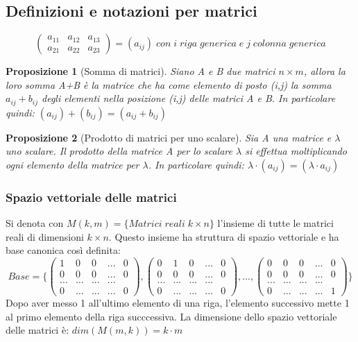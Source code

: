 \documentclass[12pt]{article}
\newenvironment{para}{\begin{adjustwidth}{13mm}{}}{\end{adjustwidth}}
\newtheorem{Proposizione}{Proposizione}[subsection]
\begin{document}
\begin{para}
\subsection{Definizioni e notazioni per matrici}
$$\begin{pmatrix}
a_{11} & a_{12} & a_{13}\\
a_{21} & a_{22} & a_{23}
\end{pmatrix} = (a_{ij}) \; con\; i\; riga\; generica\; e\; j\; colonna\; generica$$

\begin{Proposizione}[Somma di matrici] Siano A e B due matrici $n \times m$, allora la loro somma A+B è la matrice che ha come elemento di posto (i,j) la somma $a_{ij} + b_{ij}$ degli elementi nella posizione (i,j) delle matrici A e B. In particolare quindi: $(a_{ij}) + (b_{ij}) = (a_{ij} + b_{ij})$
\end{Proposizione}

\begin{Proposizione}[Prodotto di matrici per uno scalare]
Sia A una matrice e $\lambda$ uno scalare. Il prodotto della matrice A per lo scalare $\lambda$ si effettua moltiplicando ogni elemento della matrice per $\lambda$. In particolare quindi: $\lambda \cdot (a_{ij}) = (\lambda \cdot a_{ij})$
\end{Proposizione}

\subsubsection{Spazio vettoriale delle matrici}
Si denota con $M(k, m) = \{Matrici \; reali \; k \times n\}$ l'insieme di tutte le matrici reali di dimensioni $k \times n$. Questo insieme ha struttura di spazio vettoriale e ha base canonica così definita:
$$Base = \{\begin{pmatrix}
1 & 0 & 0 & ... & 0\\
0 & 0 & 0 & ...  & 0\\
... & ... & ... & ... \\
0 & ... & ... & ... & 0
\end{pmatrix}, \begin{pmatrix}
    0 & 1 & 0 & ... & 0\\
    0 & 0 & 0 & ...  & 0\\
    ... & ... & ... & ... \\
    0 & ... & ... & ... & 0
\end{pmatrix}, ..., \begin{pmatrix}
    0 & 0 & 0 & ... & 0\\
    0 & 0 & 0 & ...  & 0\\
    ... & ... & ... & ... \\
    0 & ... & ... & ... & 1
\end{pmatrix} \}$$ Dopo aver messo 1 all'ultimo elemento di una riga, l'elemento successivo mette 1 al primo elemento della riga succcessiva. La dimensione dello spazio vettoriale delle matrici è: $dim(M(m,k)) = k \cdot m$

\end{para}
\end{document}
